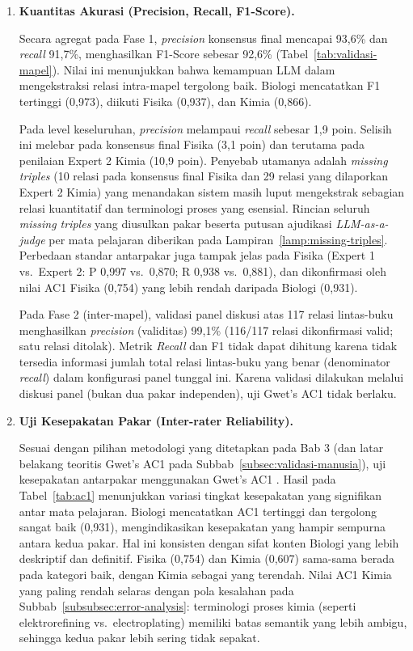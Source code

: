 \documentclass[main]{subfiles}
\begin{document}
\begin{enumerate}
  \item \textbf{Kuantitas Akurasi (Precision, Recall, F1-Score).}

  Secara agregat pada Fase 1, \textit{precision} konsensus final mencapai 93{,}6\%
  dan \textit{recall} 91{,}7\%, menghasilkan F1-Score sebesar 92{,}6\%
  (Tabel~\ref{tab:validasi-mapel}). Nilai ini menunjukkan bahwa
  kemampuan LLM dalam mengekstraksi relasi intra-mapel tergolong baik. Biologi
  mencatatkan F1 tertinggi (0{,}973), diikuti Fisika (0{,}937), dan Kimia (0{,}866).

  Pada level keseluruhan, \textit{precision} melampaui \textit{recall} sebesar
  1{,}9 poin. Selisih ini melebar pada konsensus final Fisika (3{,}1 poin) dan
  terutama pada penilaian Expert 2 Kimia (10{,}9 poin). Penyebab utamanya adalah
  \textit{missing triples} (10 relasi pada konsensus final Fisika dan 29 relasi
  yang dilaporkan Expert 2 Kimia) yang menandakan sistem masih luput
  mengekstrak sebagian relasi kuantitatif dan terminologi proses yang esensial.
  Rincian seluruh \textit{missing triples} yang diusulkan pakar beserta putusan
  ajudikasi \textit{LLM-as-a-judge} per mata pelajaran diberikan pada
  Lampiran~\ref{lamp:missing-triples}.
  Perbedaan standar antarpakar juga tampak jelas pada Fisika (Expert 1 vs.\
  Expert 2: P 0{,}997 vs.\ 0{,}870; R 0{,}938 vs.\ 0{,}881), dan dikonfirmasi
  oleh nilai AC1 Fisika (0{,}754) yang lebih rendah daripada Biologi (0{,}931).

  Pada Fase 2 (inter-mapel), validasi panel diskusi atas 117 relasi lintas-buku
  menghasilkan \textit{precision} (validitas) 99{,}1\% (116/117 relasi dikonfirmasi
  valid; satu relasi ditolak). Metrik \textit{Recall} dan F1 tidak dapat dihitung
  karena tidak tersedia informasi jumlah total relasi lintas-buku yang benar
  (denominator \textit{recall}) dalam konfigurasi panel tunggal ini. Karena validasi
  dilakukan melalui diskusi panel (bukan dua pakar independen), uji Gwet's AC1
  tidak berlaku.

  \item \textbf{Uji Kesepakatan Pakar (Inter-rater Reliability).}

  Sesuai dengan pilihan metodologi yang ditetapkan pada Bab 3 (dan latar belakang
  teoritis Gwet's AC1 pada Subbab~\ref{subsec:validasi-manusia}), uji kesepakatan antarpakar menggunakan
  Gwet's AC1 \parencite{gwet_handbook_2014}. Hasil pada Tabel~\ref{tab:ac1} menunjukkan variasi tingkat kesepakatan
  yang signifikan antar mata pelajaran. Biologi mencatatkan AC1 tertinggi dan
  tergolong sangat baik (0{,}931), mengindikasikan kesepakatan yang hampir
  sempurna antara kedua pakar. Hal ini konsisten dengan sifat konten Biologi
  yang lebih deskriptif dan definitif. Fisika (0{,}754) dan Kimia (0{,}607)
  sama-sama berada pada kategori baik, dengan Kimia sebagai yang terendah.
  Nilai AC1 Kimia yang paling rendah selaras dengan pola kesalahan pada
  Subbab~\ref{subsubsec:error-analysis}: terminologi proses kimia (seperti elektrorefining vs.\
  electroplating) memiliki batas semantik yang lebih ambigu, sehingga kedua pakar
  lebih sering tidak sepakat.
\end{enumerate}
\end{document}
